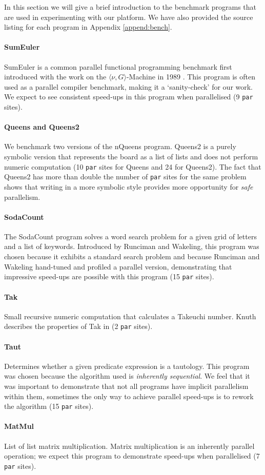 In this section we will give a brief introduction to the benchmark programs
that are used in experimenting with our platform. We have also provided the source
listing for each program in Appendix \ref{append:bench}.

\paragraph{SumEuler}
SumEuler is a common parallel functional programming benchmark first introduced
with the work on the $\langle\nu, G\rangle$-Machine in 1989 \citep{vGMachine}.
This program is often used as a parallel compiler benchmark, making it a
`sanity-check' for our work. We expect to see consistent speed-ups in this
program when parallelised (9 \verb-par- sites).

\paragraph{Queens and Queens2}
We benchmark two versions of the nQueens program. Queens2 is a purely symbolic
version that represents the board as a list of lists and does not perform
numeric computation (10 \verb-par- sites for Queens and 24 for Queens2). The
fact that Queens2 has more than double the number of \verb-par- sites for the
same problem shows that writing in a more symbolic style provides more
opportunity for \emph{safe} parallelism.

\paragraph{SodaCount} The SodaCount program
solves a word search problem for a given grid of letters and a list of
keywords.  Introduced by Runciman and Wakeling, this program was chosen because
it exhibits a standard search problem and because Runciman and Wakeling
hand-tuned and profiled a parallel version, demonstrating that impressive
speed-ups are possible with this program \citep{Runciman:1996:AFP:242105} (15
\verb-par- sites).

\paragraph{Tak}
Small recursive numeric computation that calculates a Takeuchi number. Knuth
describes the properties of Tak in \citep{ExamplesOfRecursion} (2 \verb-par-
sites).

\paragraph{Taut}
Determines whether a given predicate expression is a tautology. This program
was chosen because the algorithm used is \emph{inherently sequential}. We feel
that it was important to demonstrate that not all programs have implicit
parallelism within them, sometimes the only way to achieve parallel speed-ups
is to rework the algorithm (15 \verb-par- sites).

\paragraph{MatMul}
List of list matrix multiplication. Matrix multiplication is an inherently
parallel operation; we expect this program to demonstrate speed-ups when
parallelised (7 \verb-par- sites).
